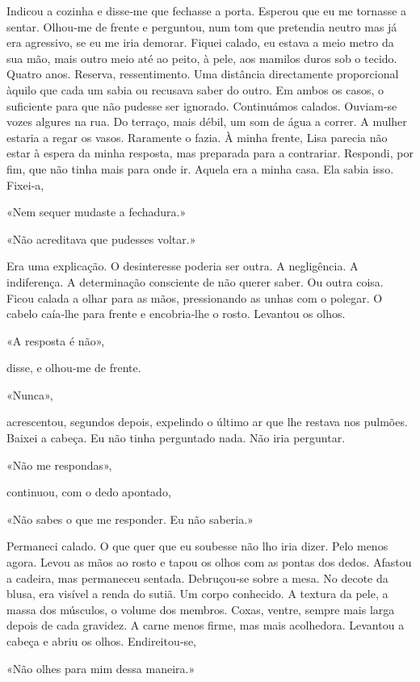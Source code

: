 Indicou a cozinha e disse­‑me que fechasse a porta. Esperou que eu me
tornasse a sentar. Olhou­‑me de frente e perguntou, num tom que
pretendia neutro mas já era agressivo, se eu me iria demorar. Fiquei
calado, eu estava a meio metro da sua mão, mais outro meio até ao peito,
à pele, aos mamilos duros sob o tecido. Quatro anos. Reserva,
ressentimento. Uma distância directamente proporcional àquilo que cada
um sabia ou recusava saber do outro. Em ambos os casos, o suficiente
para que não pudesse ser ignorado. Continuámos calados. Ouviam­‑se vozes
algures na rua. Do terraço, mais débil, um som de água a correr. A
mulher estaria a regar os vasos. Raramente o fazia. À minha frente, Lisa
parecia não estar à espera da minha resposta, mas preparada para a
contrariar. Respondi, por fim, que não tinha mais para onde ir. Aquela
era a minha casa. Ela sabia isso. Fixei­‑a,

«Nem sequer mudaste a fechadura.»

«Não acreditava que pudesses voltar.»

Era uma explicação. O desinteresse poderia ser outra. A negligência. A
indiferença. A determinação consciente de não querer saber. Ou outra
coisa. Ficou calada a olhar para as mãos, pressionando as unhas com o
polegar. O cabelo caía­‑lhe para frente e encobria­‑lhe o rosto.
Levantou os olhos.

«A resposta é não»,

disse, e olhou­‑me de frente.

«Nunca»,

acrescentou, segundos depois, expelindo o último ar que lhe restava nos
pulmões. Baixei a cabeça. Eu não tinha perguntado nada. Não iria
perguntar.

«Não me respondas»,

continuou, com o dedo apontado,

«Não sabes o que me responder. Eu não saberia.»

Permaneci calado. O que quer que eu soubesse não lho iria dizer. Pelo
menos agora. Levou as mãos ao rosto e tapou os olhos com as pontas dos
dedos. Afastou a cadeira, mas permaneceu sentada. Debruçou­‑se sobre a
mesa. No decote da blusa, era visível a renda do sutiã. Um corpo
conhecido. A textura da pele, a massa dos músculos, o volume dos
membros. Coxas, ventre, sempre mais larga depois de cada gravidez. A
carne menos firme, mas mais acolhedora. Levantou a cabeça e abriu os
olhos. Endireitou­‑se,

«Não olhes para mim dessa maneira.»

